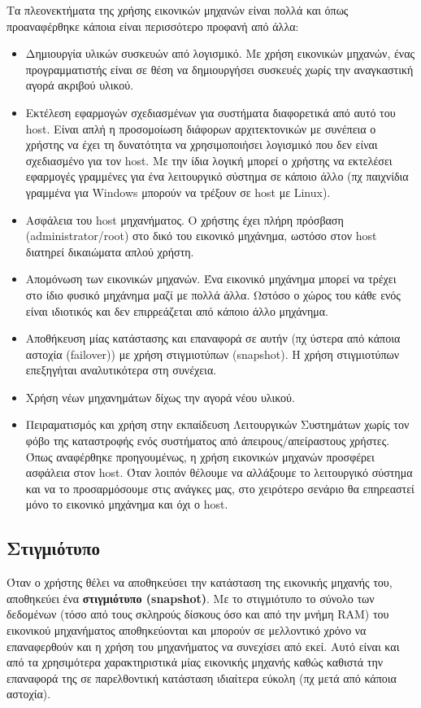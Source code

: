 Τα πλεονεκτήματα της χρήσης εικονικών μηχανών είναι πολλά και όπως προαναφέρθηκε
κάποια είναι περισσότερο προφανή από άλλα:
\begin{itemize}
	\item Δημιουργία υλικών συσκευών από λογισμικό. Με χρήση εικονικών μηχανών,
		ένας προγραμματιστής είναι σε θέση να δημιουργήσει συσκευές χωρίς την
		αναγκαστική αγορά ακριβού υλικού.
	\item Εκτέλεση εφαρμογών σχεδιασμένων για συστήματα διαφορετικά από αυτό
		του host. Είναι απλή η προσομοίωση διάφορων αρχιτεκτονικών με
		συνέπεια ο χρήστης να έχει τη δυνατότητα να χρησιμοποιήσει
		λογισμικό που δεν είναι	σχεδιασμένο για τον host. Με την ίδια
		λογική μπορεί ο χρήστης να εκτελέσει εφαρμογές γραμμένες για ένα
		λειτουργικό σύστημα σε κάποιο άλλο (πχ παιχνίδια γραμμένα για
		Windows μπορούν  να τρέξουν σε host με Linux).
	\item Ασφάλεια του host μηχανήματος. Ο χρήστης έχει πλήρη πρόσβαση
		(administrator/root) στο δικό του εικονικό μηχάνημα, ωστόσο στον host
		διατηρεί δικαιώματα απλού χρήστη.
	\item Απομόνωση των εικονικών μηχανών. Ένα εικονικό μηχάνημα μπορεί να
		τρέχει στο ίδιο φυσικό μηχάνημα μαζί με πολλά άλλα. Ωστόσο ο χώρος του
		κάθε ενός είναι ιδιοτικός και δεν επιρρεάζεται από κάποιο άλλο μηχάνημα.
	\item Αποθήκευση μίας κατάστασης και επαναφορά σε αυτήν (πχ ύστερα από
		κάποια αστοχία (failover)) με χρήση στιγμιοτύπων (snapshot). Η χρήση
		στιγμιοτύπων επεξηγήται αναλυτικότερα στη συνέχεια.
	\item Χρήση νέων μηχανημάτων δίχως την αγορά νέου υλικού.
	\item Πειραματισμός και χρήση στην εκπαίδευση Λειτουργικών Συστημάτων
		χωρίς τον φόβο της καταστροφής ενός συστήματος από
		άπειρους/απείραστους χρήστες. Όπως αναφέρθηκε προηγουμένως, η χρήση
		εικονικών μηχανών προσφέρει ασφάλεια στον host. Όταν λοιπόν θέλουμε να
		αλλάξουμε το λειτουργικό σύστημα και να το προσαρμόσουμε στις ανάγκες
		μας, στο χειρότερο σενάριο θα επηρεαστεί μόνο το εικονικό μηχάνημα και
		όχι ο host.
\end{itemize}

\subsection{Στιγμιότυπο}
Όταν ο χρήστης θέλει να αποθηκεύσει την κατάσταση της εικονικής μηχανής του,
αποθηκεύει ένα \textbf{στιγμιότυπο (snapshot)}. Με το στιγμιότυπο το σύνολο των
δεδομένων (τόσο από τους σκληρούς δίσκους όσο και από την μνήμη RAM) του
εικονικού μηχανήματος αποθηκεύονται και μπορούν σε μελλοντικό χρόνο να
επαναφερθούν και η χρήση του μηχανήματος να συνεχίσει από εκεί. Αυτό είναι
και από τα χρησιμότερα χαρακτηριστικά μίας εικονικής μηχανής καθώς καθιστά την
επαναφορά της σε παρελθοντική κατάσταση ιδιαίτερα εύκολη (πχ μετά από κάποια
αστοχία).


